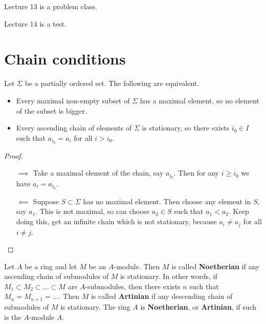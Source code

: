 
Lecture 13 is a problem class.


Lecture 14 is a test.

\pagebreak

\section{Chain conditions}


\begin{lemma}
\label{lem:11.1}
Let $ \Sigma $ be a partially ordered set. The following are equivalent.
\begin{itemize}
\item Every maximal non-empty subset of $ \Sigma $ has a maximal element, so no element of the subset is bigger.
\item Every ascending chain of elements of $ \Sigma $ is stationary, so there exists $ i_0 \in I $ such that $ a_{i_0} = a_i $ for all $ i > i_0 $.
\end{itemize}
\end{lemma}

\begin{proof}
\hfill
\begin{enumerate}
\item[$ \implies $] Take a maximal element of the chain, say $ a_{i_0} $. Then for any $ i \ge i_0 $ we have $ a_i = a_{i_0} $.
\item[$ \impliedby $] Suppose $ S \subset \Sigma $ has no maximal element. Then choose any element in $ S $, say $ a_1 $. This is not maximal, so can choose $ a_2 \in S $ such that $ a_1 < a_2 $. Keep doing this, get an infinite chain which is not stationary, because $ a_i \ne a_j $ for all $ i \ne j $.
\end{enumerate}
\end{proof}

\begin{definition}
Let $ A $ be a ring and let $ M $ be an $ A $-module. Then $ M $ is called \textbf{Noetherian} if any ascending chain of submodules of $ M $ is stationary. In other words, if $ M_1 \subset M_2 \subset \dots \subset M $ are $ A $-submodules, then there exists $ n $ such that $ M_n = M_{n + 1} = \dots $. Then $ M $ is called \textbf{Artinian} if any descending chain of submodules of $ M $ is stationary. The ring $ A $ is \textbf{Noetherian}, or \textbf{Artinian}, if such is the $ A $-module $ A $.
\end{definition}

